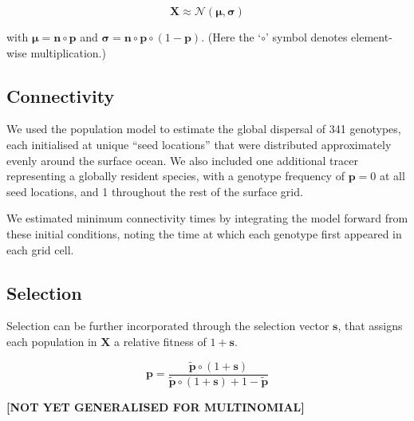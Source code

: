 \documentclass[12pt]{article}
\begin{document}
\begin{equation}
\mathbf{X}\approx\mathcal{N}(\boldsymbol{\mu},\boldsymbol{\sigma})
\end{equation}

with $\boldsymbol{\mu}=\mathbf{n}\circ\mathbf{p}$ and $\boldsymbol{\sigma}=\mathbf{n}\circ\mathbf{p}\circ(1-\mathbf{p})$. (Here the `$\circ$' symbol denotes element-wise multiplication.)

\subsection{Connectivity}

We used the population model to estimate the global dispersal of 341 genotypes, each initialised at unique ``seed locations'' that were distributed approximately evenly around the surface ocean. We also included one additional tracer representing a globally resident species, with a genotype frequency of $\mathbf{p} = 0$ at all seed locations, and 1 throughout the rest of the surface grid.

We estimated minimum connectivity times by integrating the model forward from these initial conditions, noting the time at which each genotype first appeared in each grid cell. 


\subsection{Selection}

Selection can be further incorporated through the selection vector $\mathbf{s}$, that assigns each population in $\mathbf{X}$ a relative fitness of $1+\mathbf{s}$.

\begin{equation}
\label{ }
\mathbf{p} = \frac{\mathbf{\tilde{p}} \circ (1+\mathbf{s}) } {\mathbf{\tilde{p}} \circ (1+\mathbf{s}) + 1 -\mathbf{\tilde{p}}}
\end{equation}

\textbf{[NOT YET GENERALISED FOR MULTINOMIAL]}


\end{document}
